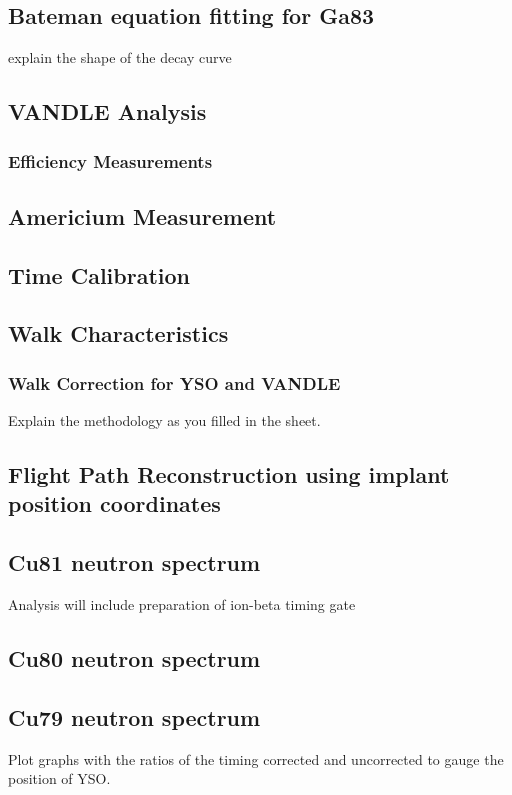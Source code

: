 \subsection{Bateman equation fitting for Ga83}
explain the shape of the decay curve 
\subsection{VANDLE Analysis}
\subsubsection{Efficiency Measurements}
\subsection{Americium Measurement}
\subsection{Time Calibration}
\subsection{Walk Characteristics}
\subsubsection {Walk Correction for YSO and VANDLE}
Explain the methodology as you filled in the sheet.
\subsection{Flight Path Reconstruction using implant position coordinates}
\subsection{Cu81 neutron spectrum}

Analysis will include preparation of ion-beta timing gate

\subsection{Cu80 neutron spectrum}
\subsection{Cu79 neutron spectrum}




Plot graphs with the ratios of the timing corrected and uncorrected to gauge the position of YSO.

